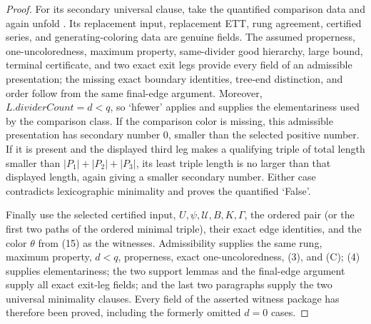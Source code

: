 \begin{proof}
For its secondary universal clause, take the quantified comparison data
and again unfold .  Its
replacement input, replacement ETT, rung agreement, certified series,
and generating-coloring data are genuine fields.  The assumed properness,
one-uncoloredness, maximum property, same-divider good hierarchy, large
bound, terminal certificate, and two exact exit legs provide every field
of an admissible presentation; the missing exact boundary identities,
tree-end distinction, and order follow from the same final-edge argument.
Moreover,
$L.\mathit{dividerCount}=d<q$, so `hfewer' applies and supplies the
elementariness used by the comparison class.  If the comparison color is
missing, this admissible presentation has secondary number $0$, smaller
than the selected positive number.  If it is present and the displayed
third leg makes a qualifying triple of total length smaller than
$|P_1|+|P_2|+|P_3|$, its least triple length is no larger than that
displayed length, again giving a smaller secondary number.  Either case
contradicts lexicographic minimality and proves the quantified `False'.

Finally use the selected certified input, $U,\psi,\mathcal U,B,K,\Gamma$,
the ordered pair (or the first two paths of the ordered minimal triple),
their exact edge identities, and the color $\theta$ from (15) as the
witnesses.  Admissibility supplies the same rung, maximum property,
$d<q$, properness, exact one-uncoloredness, (3), and (C); (4) supplies
elementariness; the two support lemmas and the final-edge argument supply
all exact exit-leg fields; and the last two paragraphs supply the two
universal minimality clauses.  Every field of the asserted witness package
has therefore been proved, including the formerly omitted $d=0$ cases.
\end{proof}

